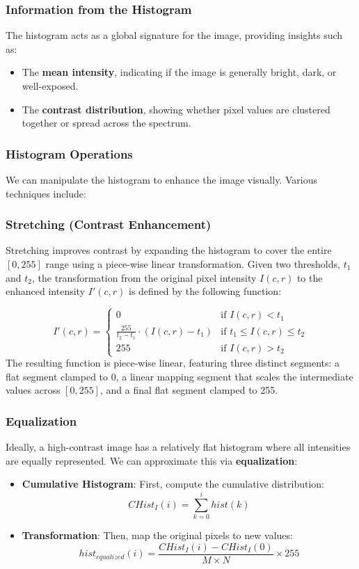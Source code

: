\subsubsection{Information from the Histogram}
The histogram acts as a global signature for the image, providing insights such as:
\begin{itemize}
    \item The \textbf{mean intensity}, indicating if the image is generally bright, dark, or well-exposed.
    \item The \textbf{contrast distribution}, showing whether pixel values are clustered together or spread across the spectrum.
\end{itemize}

\subsubsection{Histogram Operations}
We can manipulate the histogram to enhance the image visually. Various techniques include:

\subsubsection*{Stretching (Contrast Enhancement)}
Stretching improves contrast by expanding the histogram to cover the entire $[0, 255]$ range using a piece-wise linear transformation. 
Given two thresholds, $t_1$ and $t_2$, the transformation from the original pixel intensity $I(c,r)$ to the enhanced intensity $I'(c,r)$ is defined by the following function:

$$I'(c,r) = 
\begin{cases} 
    0 & \text{if } I(c,r) < t_1 \\ 
    \frac{255}{t_2 - t_1} \cdot (I(c,r) - t_1) & \text{if } t_1 \leq I(c,r) \leq t_2 \\ 
    255 & \text{if } I(c,r) > t_2 
\end{cases}$$
The resulting function is piece-wise linear, featuring three distinct segments: a flat segment clamped to 0, a linear mapping segment that scales the intermediate values across $[0, 255]$, and a final flat segment clamped to 255.

\subsubsection*{Equalization}
Ideally, a high-contrast image has a relatively flat histogram where all intensities are equally represented. We can approximate this via \textbf{equalization}:
\begin{itemize}
    \item \textbf{Cumulative Histogram}: First, compute the cumulative distribution:
    \[ CHist_I(i) = \sum_{k=0}^{i} hist(k) \]
    \item \textbf{Transformation}: Then, map the original pixels to new values:
    \[ hist_{equalized}(i) = \frac{CHist_I(i) - CHist_I(0)}{M \times N} \times 255 \]
\end{itemize}

